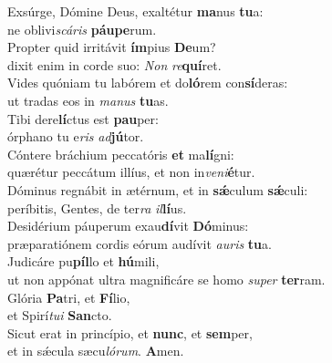 \oddverse Exsúrge, Dómine Deus, exaltétur \textbf{ma}nus \textbf{tu}a:~\*\\
\oddverse ne oblivi\textit{scá}\textit{ris} \textbf{páu}\textbf{pe}rum.\\
\evenverse Propter quid irritávit \textbf{ím}pius \textbf{De}um?~\*\\
\evenverse dixit enim in corde suo: \textit{Non} \textit{re}\textbf{quí}ret.\\
\oddverse Vides quóniam tu labórem et do\textbf{ló}rem con\textbf{sí}deras:~\*\\
\oddverse ut tradas eos in \textit{ma}\textit{nus} \textbf{tu}as.\\
\evenverse Tibi dere\textbf{lí}ctus est \textbf{pau}per:~\*\\
\evenverse órphano tu e\textit{ris} \textit{ad}\textbf{jú}tor.\\
\oddverse Cóntere bráchium peccatóris \textbf{et} ma\textbf{lí}gni:~\*\\
\oddverse quærétur peccátum illíus, et non in\textit{ve}\textit{ni}\textbf{é}tur.\\
\evenverse Dóminus regnábit in ætérnum, et in \textbf{sǽ}culum \textbf{sǽ}culi:~\*\\
\evenverse períbitis, Gentes, de ter\textit{ra} \textit{il}\textbf{lí}us.\\
\oddverse Desidérium páuperum exau\textbf{dí}vit \textbf{Dó}minus:~\*\\
\oddverse præparatiónem cordis eórum audívit \textit{au}\textit{ris} \textbf{tu}a.\\
\evenverse Judicáre pu\textbf{píl}lo et \textbf{hú}mili,~\*\\
\evenverse ut non appónat ultra magnificáre se homo \textit{su}\textit{per} \textbf{ter}ram.\\
\oddverse Glória \textbf{Pa}tri, et \textbf{Fí}lio,~\*\\
\oddverse et Spirí\textit{tu}\textit{i} \textbf{San}cto.\\
\evenverse Sicut erat in princípio, et \textbf{nunc}, et \textbf{sem}per,~\*\\
\evenverse et in sǽcula sæcu\textit{ló}\textit{rum}. \textbf{A}men.\\
